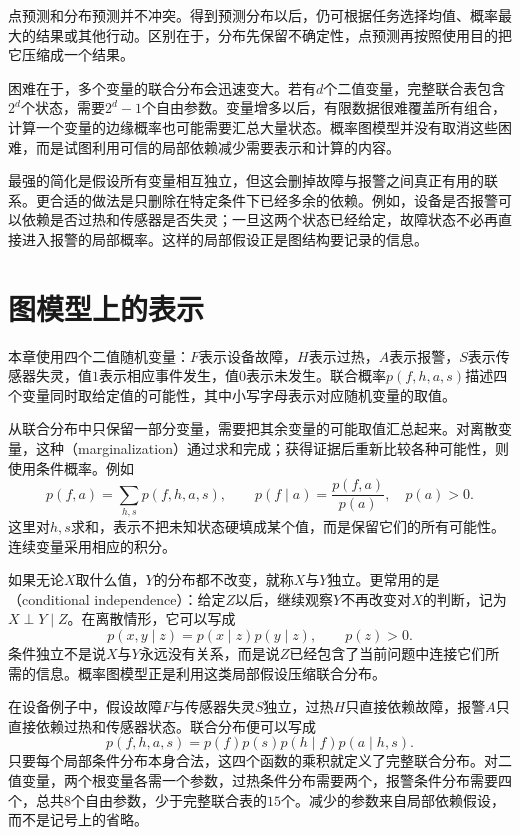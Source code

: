 点预测和分布预测并不冲突。得到预测分布以后，仍可根据任务选择均值、概率最大的结果或其他行动。区别在于，分布先保留不确定性，点预测再按照使用目的把它压缩成一个结果。

困难在于，多个变量的联合分布会迅速变大。若有$d$个二值变量，完整联合表包含$2^d$个状态，需要$2^d-1$个自由参数。变量增多以后，有限数据很难覆盖所有组合，计算一个变量的边缘概率也可能需要汇总大量状态。概率图模型并没有取消这些困难，而是试图利用可信的局部依赖减少需要表示和计算的内容。

最强的简化是假设所有变量相互独立，但这会删掉故障与报警之间真正有用的联系。更合适的做法是只删除在特定条件下已经多余的依赖。例如，设备是否报警可以依赖是否过热和传感器是否失灵；一旦这两个状态已经给定，故障状态不必再直接进入报警的局部概率。这样的局部假设正是图结构要记录的信息。

\section{图模型上的表示}
\label{sec:pgm-overview-representation}
\label{sec:pgm-overview-basic-concepts}

本章使用四个二值随机变量：$F$表示设备故障，$H$表示过热，$A$表示报警，$S$表示传感器失灵，值$1$表示相应事件发生，值$0$表示未发生。联合概率$p(f,h,a,s)$描述四个变量同时取给定值的可能性，其中小写字母表示对应随机变量的取值。

从联合分布中只保留一部分变量，需要把其余变量的可能取值汇总起来。对离散变量，这种（marginalization）通过求和完成；获得证据后重新比较各种可能性，则使用条件概率。例如
\begin{equation}
  p(f,a)=\sum_{h,s}p(f,h,a,s),
  \qquad
  p(f\mid a)=\frac{p(f,a)}{p(a)},\quad p(a)>0.
  \label{eq:pgm-overview-marginal-conditional}
\end{equation}
这里对$h,s$求和，表示不把未知状态硬填成某个值，而是保留它们的所有可能性。连续变量采用相应的积分。

如果无论$X$取什么值，$Y$的分布都不改变，就称$X$与$Y$独立。更常用的是（conditional independence）：给定$Z$以后，继续观察$Y$不再改变对$X$的判断，记为$X\perp Y\mid Z$。在离散情形，它可以写成
\begin{equation}
  p(x,y\mid z)=p(x\mid z)p(y\mid z),
  \qquad p(z)>0.
  \label{eq:pgm-overview-conditional-independence}
\end{equation}
条件独立不是说$X$与$Y$永远没有关系，而是说$Z$已经包含了当前问题中连接它们所需的信息。概率图模型正是利用这类局部假设压缩联合分布。

在设备例子中，假设故障$F$与传感器失灵$S$独立，过热$H$只直接依赖故障，报警$A$只直接依赖过热和传感器状态。联合分布便可以写成
\begin{equation}
  p(f,h,a,s)=p(f)p(s)p(h\mid f)p(a\mid h,s).
  \label{eq:pgm-overview-device-joint}
\end{equation}
只要每个局部条件分布本身合法，这四个函数的乘积就定义了完整联合分布。对二值变量，两个根变量各需一个参数，过热条件分布需要两个，报警条件分布需要四个，总共$8$个自由参数，少于完整联合表的$15$个。减少的参数来自局部依赖假设，而不是记号上的省略。

